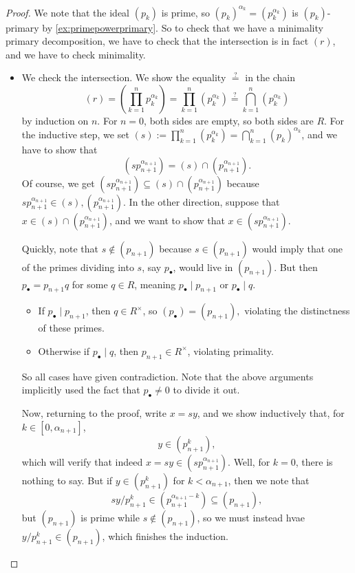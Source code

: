 \begin{proof}
	We note that the ideal $(p_k)$ is prime, so $(p_k)^{\alpha_k}=(p_k^{\alpha_k})$ is $(p_k)$-primary by \autoref{ex:primepowerprimary}. So to check that we have a minimality primary decomposition, we have to check that the intersection is in fact $(r)$, and we have to check minimality. \begin{itemize}
		\item We check the intersection. We show the equality $\stackrel?=$ in the chain
		\[(r)=\left(\prod_{k=1}^np_k^{\alpha_k}\right)=\prod_{k=1}^n\left(p_k^{\alpha_k}\right)\stackrel?=\bigcap_{k=1}^n\left(p_k^{\alpha_k}\right)\]
		by induction on $n$. For $n=0$, both sides are empty, so both sides are $R$. For the inductive step, we set $(s):=\prod_{k=1}^n\left(p_k^{\alpha_k}\right)=\bigcap_{k=1}^n\left(p_k\right)^{\alpha_k}$, and we have to show that
		\[\left(sp_{n+1}^{\alpha_{n+1}}\right)=(s)\cap\left(p_{n+1}^{\alpha_{n+1}}\right).\]
		Of course, we get $\left(sp_{n+1}^{\alpha_{n+1}}\right)\subseteq(s)\cap\left(p_{n+1}^{\alpha_{n+1}}\right)$ because $sp_{n+1}^{\alpha_{n+1}}\in(s),\left(p_{n+1}^{\alpha_{n+1}}\right)$. In the other direction, suppose that $x\in(s)\cap\left(p_{n+1}^{\alpha_{n+1}}\right)$, and we want to show that $x\in\left(sp_{n+1}^{\alpha_{n+1}}\right)$.
		
		Quickly, note that $s\notin(p_{n+1})$ because $s\in(p_{n+1})$ would imply that one of the primes dividing into $s$, say $p_\bullet$, would live in $(p_{n+1})$. But then $p_\bullet=p_{n+1}q$ for some $q\in R$, meaning $p_\bullet\mid p_{n+1}$ or $p_\bullet\mid q$.
		\begin{itemize}
			\item If $p_\bullet\mid p_{n+1}$, then $q\in R^\times$, so $(p_\bullet)=(p_{n+1}),$ violating the distinctness of these primes.
			\item Otherwise if $p_\bullet\mid q$, then $p_{n+1}\in R^\times$, violating primality.
		\end{itemize}
		So all cases have given contradiction. Note that the above arguments implicitly used the fact that $p_\bullet\ne0$ to divide it out.
		
		Now, returning to the proof, write $x=sy$, and we show inductively that, for $k\in[0,\alpha_{n+1}]$,
		\[y\in\left(p_{n+1}^k\right),\]
		which will verify that indeed $x=sy\in\left(sp_{n+1}^{\alpha_{n+1}}\right)$. Well, for $k=0$, there is nothing to say. But if $y\in\left(p_{n+1}^k\right)$ for $k<\alpha_{n+1}$, then we note that
		\[sy/p_{n+1}^k\in\left(p_{n+1}^{\alpha_{n+1}-k}\right)\subseteq(p_{n+1}),\]
		but $(p_{n+1})$ is prime while $s\notin(p_{n+1})$, so we must instead hvae $y/p_{n+1}^k\in(p_{n+1})$, which finishes the induction.


\end{itemize}
\end{proof}
